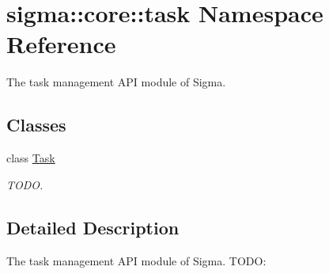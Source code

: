 \hypertarget{namespacesigma_1_1core_1_1task}{\section{sigma\-:\-:core\-:\-:task Namespace Reference}
\label{namespacesigma_1_1core_1_1task}
}


The task management A\-P\-I module of Sigma.  


\subsection*{Classes}
\begin{DoxyCompactItemize}
\item 
class \hyperlink{classsigma_1_1core_1_1task_1_1_task}{Task}
\begin{DoxyCompactList}\small\item\em T\-O\-D\-O. \end{DoxyCompactList}\end{DoxyCompactItemize}


\subsection{Detailed Description}
The task management A\-P\-I module of Sigma. T\-O\-D\-O\-: 